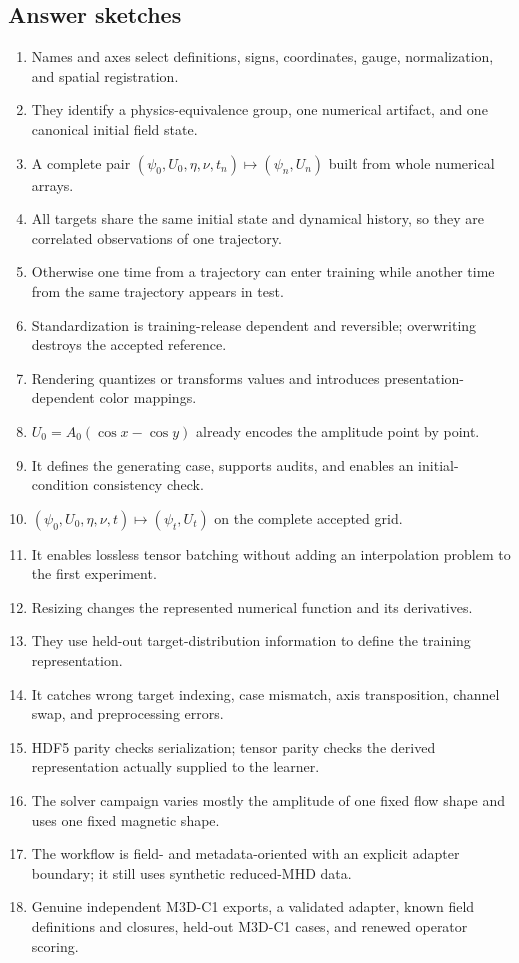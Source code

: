 \documentclass[11pt]{article}
\begin{document}
\subsection*{Answer sketches}
\begin{enumerate}[label=\textbf{A\arabic*.}]
  \item Names and axes select definitions, signs, coordinates, gauge, normalization, and spatial registration.
  \item They identify a physics-equivalence group, one numerical artifact, and one canonical initial field state.
  \item A complete pair $(\psi_0,U_0,\eta,\nu,t_n)\mapsto(\psi_n,U_n)$ built from whole numerical arrays.
  \item All targets share the same initial state and dynamical history, so they are correlated observations of one trajectory.
  \item Otherwise one time from a trajectory can enter training while another time from the same trajectory appears in test.
  \item Standardization is training-release dependent and reversible; overwriting destroys the accepted reference.
  \item Rendering quantizes or transforms values and introduces presentation-dependent color mappings.
  \item $U_0=A_0(\cos x-\cos y)$ already encodes the amplitude point by point.
  \item It defines the generating case, supports audits, and enables an initial-condition consistency check.
  \item $(\psi_0,U_0,\eta,\nu,t)\mapsto(\psi_t,U_t)$ on the complete accepted grid.
  \item It enables lossless tensor batching without adding an interpolation problem to the first experiment.
  \item Resizing changes the represented numerical function and its derivatives.
  \item They use held-out target-distribution information to define the training representation.
  \item It catches wrong target indexing, case mismatch, axis transposition, channel swap, and preprocessing errors.
  \item HDF5 parity checks serialization; tensor parity checks the derived representation actually supplied to the learner.
  \item The solver campaign varies mostly the amplitude of one fixed flow shape and uses one fixed magnetic shape.
  \item The workflow is field- and metadata-oriented with an explicit adapter boundary; it still uses synthetic reduced-MHD data.
  \item Genuine independent M3D-C1 exports, a validated adapter, known field definitions and closures, held-out M3D-C1 cases, and renewed operator scoring.
\end{enumerate}
\end{document}
